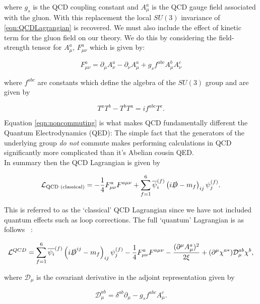 	\noindent where $g_s$ is the QCD coupling constant and $A_\mu^a$ is the QCD gauge field associated with the gluon.
	With this replacement the local $SU(3)$ invariance of \eqref{eqn:QCDLagrangian} is recovered.  We must also include
	the effect of kinetic term for the gluon field on our theory.  We do this by considering the field-strength tensor for $A^a_\mu$,
	$F^a_{\mu\nu}$ which is given by:

	\begin{equation}
		F^a_{\mu\nu} = \partial_\mu A^a_\nu - \partial_\nu A^a_\mu + g_sf^{abc}A_\mu^bA_\nu^c
	\end{equation}

	\noindent where $f^{abc}$ are constants which define the algebra of the $SU(3)$ group and are given by

	\begin{equation}
		T^aT^b -T^bT^a = if^{abc}T^c.
		\label{eqn:noncommuting}
	\end{equation}

	Equation \eqref{eqn:noncommuting} is what makes QCD fundamentally different the Quantum Electrodynamics (QED):  The simple
	fact that the generators of the underlying group \emph{do not} commute makes performing calculations in QCD
	significantly more complicated than it's Abelian cousin QED.\\
	In summary then the QCD Lagrangian is given by

	\begin{equation}
		\mathcal{L}_{\text{QCD (classical)}} = -\frac{1}{4}F_{\mu\nu}^aF^{a\mu\nu} + \sum_{f=1}^{6}\overline{\psi}_i^{(f)}\left(i\slashed D- m_f\right)_{ij}\psi_j^{(f)}.
	\end{equation}

	This is referred to as the `classical' QCD Lagrangian since we have not included quantum effects such as
	loop corrections.  The full `quantum' Lagrangian is as follows ~\cite{muta}:

	\begin{equation}
		\mathcal{L}^{QCD}=\sum_{f=1}^{6}\overline{\psi_{i}}^{(f)}\left(i\slashed D^{ij}-m_f\right)_{ij}\psi_{j}^{(f)} -
			\frac{1}{4}F^a_{\mu\nu}F^{a\mu\nu} - \frac{(\partial^\mu A_{\mu}^a)^2}{2\xi} +
			(\partial^\mu\chi^{a*})\mathcal{D}_{\mu}^{ab}\chi^b,
			\label{eqn:fullQCD}
	\end{equation}

	where $\mathcal{D}_{\mu}$ is the covariant derivative in the adjoint representation given by

	\begin{equation}
		\mathcal{D}_\mu^{ab} = \delta^{ab}\partial_\mu - g_sf^{abc}A^c_\mu.
	\end{equation}

